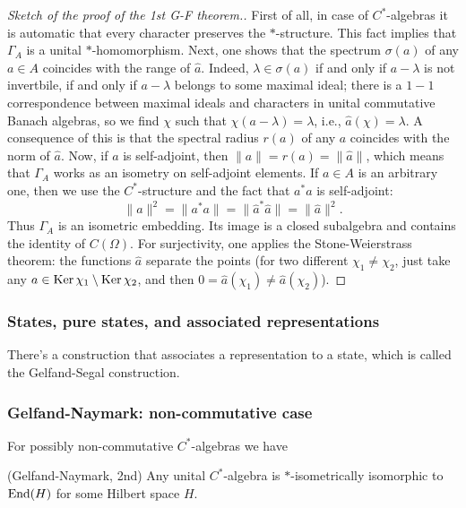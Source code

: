 \begin{proof}[Sketch of the proof of the 1st G-F theorem.]
First of all, in case of $C^*$-algebras it is automatic that every character preserves the $\ast$-structure. This fact implies that $\Gamma_A$ is a unital $\ast$-homomorphism. Next, one shows that the spectrum $\sigma(a)$ of any $a \in A$ coincides with the range of $\hat{a}$. Indeed, $\lambda \in \sigma(a)$ if and only if $a-\lambda$ is not invertbile, if and only if $a-\lambda$ belongs to some maximal ideal; there is a $1-1$ correspondence between maximal ideals and characters in unital commutative Banach algebras, so we find $\chi$ such that $\chi(a-\lambda) = \lambda$, i.e., $\hat{a}(\chi) = \lambda$. A consequence of this is that the spectral radius $r(a)$ of any $a$ coincides with the norm of $\hat{a}$. Now, if $a$ is self-adjoint, then $\|a\| = r(a) = \|\hat{a}\|$, which means that $\Gamma_A$ works as an isometry on self-adjoint elements. If $a \in A$ is an arbitrary one, then we use the $C^*$-structure and the fact that $a^*a$ is self-adjoint:
\[
\|a\|^2 = \|a^* a\| = \|\hat{a}^* \hat{a}\| = \|\hat{a}\|^2.
\]
Thus $\Gamma_A$ is an isometric embedding. Its image is a closed subalgebra and contains the identity of $C(\Omega)$. For surjectivity, one applies the Stone-Weierstrass theorem: the functions $\hat{a}$ separate the points (for two different $\chi_1 \neq \chi_2$, just take any $a \in \operatorname{Ker} \chi_1 \setminus \operatorname{Ker} \chi_2$, and then $0 = \hat{a}(\chi_1) \neq \hat{a}(\chi_2)$).
\end{proof}

\subsubsection{States, pure states, and associated representations}
There's a construction that associates a representation to a state, which is called the Gelfand-Segal construction.

\subsubsection{Gelfand-Naymark: non-commutative case}
For possibly non-commutative $C^*$-algebras we have 
\begin{theorem}
(Gelfand-Naymark, 2nd) Any unital $C^*$-algebra is $*$-isometrically isomorphic to $\operatorname{End}(H)$ for some Hilbert space $H$.
\end{theorem}

